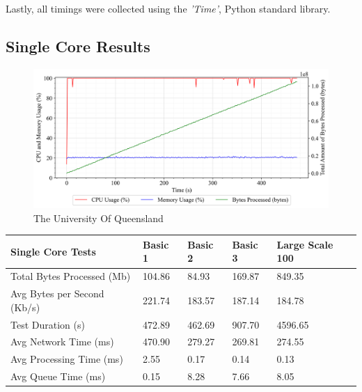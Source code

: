 Lastly, all timings were collected using the \textit{'Time'}, Python standard library. 

\newpage
\subsection{Single Core Results}
\begin{figure}[ht]
    \begin{center}
    \includegraphics[width=1.0\textwidth]{Chapter4/Results/1c_results/arty-a7-1c_basic_1_20241004_110917.db_server_metrics.png}
    \caption{The University Of Queensland}
    \label{Fig:1}
    \end{center}
\end{figure}

\begin{table}[!ht]
    \centering
    \begin{tabular}{|l|l|l|l|l|}
    \hline
        Single Core Tests & Basic 1 & Basic 2 & Basic 3 & Large Scale 100 \\ \hline
        Total Bytes Processed (Mb) & 104.86 & 84.93 & 169.87 & 849.35 \\ \hline
        Avg Bytes per Second (Kb/s) & 221.74 & 183.57 & 187.14 & 184.78 \\ \hline
        Test Duration (s) & 472.89 & 462.69 & 907.70 & 4596.65 \\ \hline
        Avg Network Time (ms) & 470.90 & 279.27 & 269.81 & 274.55 \\ \hline
        Avg Processing Time (ms) & 2.55 & 0.17 & 0.14 & 0.13 \\ \hline
        Avg Queue Time (ms) & 0.15 & 8.28 & 7.66 & 8.05 \\ \hline
    \end{tabular}
\end{table}

